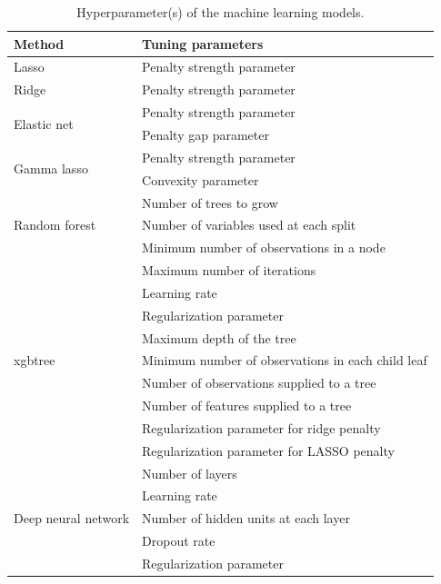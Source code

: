 \begin{refsection}
\begin{table}[htbp]
  \centering
    \begin{tabular}{l|l}
    Method & Tuning parameters \\
    \midrule
    Lasso & Penalty strength parameter \\
    \midrule
    Ridge & Penalty strength parameter \\
    \midrule
    \multirow{2}[2]{*}{Elastic net} & Penalty strength parameter \\
          & Penalty gap parameter \\
    \midrule
    \multirow{2}[2]{*}{Gamma lasso} & Penalty strength parameter \\
          & Convexity parameter \\
    \midrule
    \multirow{3}[2]{*}{Random forest} & Number of trees to grow \\
          & Number of variables used at each split \\
          & Minimum number of observations in a node \\
    \midrule
    \multirow{9}[2]{*}{xgbtree} & Maximum number of iterations \\
          & Learning rate \\
          & Regularization parameter \\
          & Maximum depth of the tree \\
          & Minimum number of observations in each child leaf \\
          & Number of observations supplied to a tree \\
          & Number of features supplied to a tree \\
          & Regularization parameter for ridge penalty \\
          & Regularization parameter for LASSO penalty \\
    \midrule
    \multirow{5}[1]{*}{Deep neural network} & Number of layers  \\
          & Learning rate \\
          & Number of hidden units at each layer \\
          & Dropout rate \\
          & Regularization parameter \\
    \end{tabular}%
  \caption[Hyperparameter(s) of the machine learning models]{Hyperparameter(s) of the machine learning models.}
  \label{tab:hyperpara}%
\end{table}%


\end{refsection}
